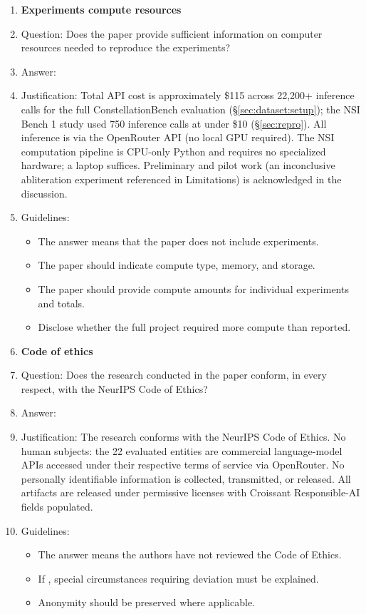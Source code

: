 \begin{enumerate}
\item {\bf Experiments compute resources}
    \item[] Question: Does the paper provide sufficient information on computer resources needed to reproduce the experiments?
    \item[] Answer: \answerYes{}
    \item[] Justification: Total API cost is approximately \$115 across 22{,}200+ inference calls for the full ConstellationBench evaluation (\S\ref{sec:dataset:setup}); the NSI Bench 1 study used 750 inference calls at under \$10 (\S\ref{sec:repro}). All inference is via the OpenRouter API (no local GPU required). The NSI computation pipeline is CPU-only Python and requires no specialized hardware; a laptop suffices. Preliminary and pilot work (an inconclusive abliteration experiment referenced in Limitations) is acknowledged in the discussion.
    \item[] Guidelines:
    \begin{itemize}
        \item The answer \answerNA{} means that the paper does not include experiments.
        \item The paper should indicate compute type, memory, and storage.
        \item The paper should provide compute amounts for individual experiments and totals.
        \item Disclose whether the full project required more compute than reported.
    \end{itemize}

\item {\bf Code of ethics}
    \item[] Question: Does the research conducted in the paper conform, in every respect, with the NeurIPS Code of Ethics?
    \item[] Answer: \answerYes{}
    \item[] Justification: The research conforms with the NeurIPS Code of Ethics. No human subjects: the 22 evaluated entities are commercial language-model APIs accessed under their respective terms of service via OpenRouter. No personally identifiable information is collected, transmitted, or released. All artifacts are released under permissive licenses with Croissant Responsible-AI fields populated.
    \item[] Guidelines:
    \begin{itemize}
        \item The answer \answerNA{} means the authors have not reviewed the Code of Ethics.
        \item If \answerNo{}, special circumstances requiring deviation must be explained.
        \item Anonymity should be preserved where applicable.
    \end{itemize}



\end{enumerate}
